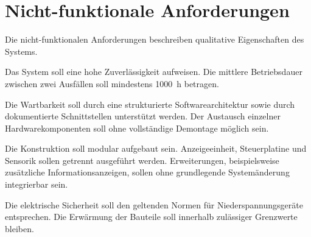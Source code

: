 \section{Nicht-funktionale Anforderungen} 
Die nicht-funktionalen Anforderungen beschreiben qualitative Eigenschaften des Systems.

Das System soll eine hohe Zuverlässigkeit aufweisen. Die mittlere Betriebsdauer zwischen zwei Ausfällen soll mindestens 1000~h betragen.

Die Wartbarkeit soll durch eine strukturierte Softwarearchitektur sowie durch dokumentierte Schnittstellen unterstützt werden. Der Austausch einzelner Hardwarekomponenten soll ohne vollständige Demontage möglich sein.

Die Konstruktion soll modular aufgebaut sein. Anzeigeeinheit, Steuerplatine und Sensorik sollen getrennt ausgeführt werden. Erweiterungen, beispielsweise zusätzliche Informationsanzeigen, sollen ohne grundlegende Systemänderung integrierbar sein.

Die elektrische Sicherheit soll den geltenden Normen für Niederspannungsgeräte entsprechen. Die Erwärmung der Bauteile soll innerhalb zulässiger Grenzwerte bleiben.
